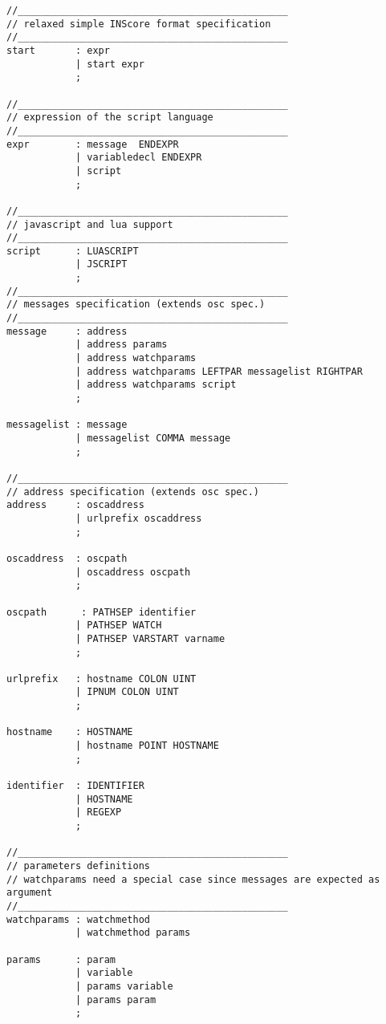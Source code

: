 \begin{verbatim}
//_______________________________________________
// relaxed simple INScore format specification
//_______________________________________________
start       : expr
            | start expr
            ;

//_______________________________________________
// expression of the script language
//_______________________________________________
expr        : message  ENDEXPR		
            | variabledecl ENDEXPR	
            | script            
            ;

//_______________________________________________
// javascript and lua support
//_______________________________________________
script      : LUASCRIPT            
            | JSCRIPT            
            ;
//_______________________________________________
// messages specification (extends osc spec.)
//_______________________________________________
message	    : address 
            | address params            
            | address watchparams		
            | address watchparams LEFTPAR messagelist RIGHTPAR
            | address watchparams script 
            ;

messagelist : message            		
            | messagelist COMMA message 
            ;

//_______________________________________________
// address specification (extends osc spec.)
address	    : oscaddress            	
            | urlprefix oscaddress		
            ;

oscaddress  : oscpath            		
            | oscaddress oscpath		
            ;

oscpath	     : PATHSEP identifier		
            | PATHSEP WATCH            	
            | PATHSEP VARSTART varname	
            ;

urlprefix   : hostname COLON UINT		
            | IPNUM COLON UINT            
            ;

hostname    : HOSTNAME            		
            | hostname POINT HOSTNAME	
            ;

identifier  : IDENTIFIER		
            | HOSTNAME            
            | REGEXP            
            ;

//_______________________________________________
// parameters definitions
// watchparams need a special case since messages are expected as argument
//_______________________________________________
watchparams : watchmethod		
            | watchmethod params 

params      : param            	
            | variable            
            | params variable	
            | params param		
            ;


\end{verbatim}
